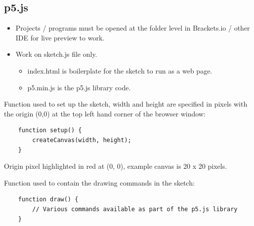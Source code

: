 \documentclass{article}
\begin{document}
\subsection*{p5.js}
\begin{itemize}
    \item Projects / programs must be opened at the folder level in Brackets.io / other IDE for live preview to work.
    \item Work on sketch.js file only. 
        \begin{itemize}
            \item index.html is boilerplate for the sketch to run as a web page.
            \item p5.min.js is the p5.js library code.
        \end{itemize}
\end{itemize}

\vspace*{0.5cm}
\noindent Function used to set up the sketch, width and height are specified in pixels with the origin (0,0) at the top left hand corner of the browser window:

\vspace*{0.25cm}
\begin{verbatim}
    function setup() {
        createCanvas(width, height);
    }
    \end{verbatim}


\begin{center}

\vspace*{0.5cm}
Origin pixel highlighted in red at (0, 0), example canvas is 20 x 20 pixels.
\end{center}

\newpage
\noindent Function used to contain the drawing commands in the sketch:
\begin{verbatim}
    function draw() {
        // Various commands available as part of the p5.js library
    }
    \end{verbatim}
\end{document}
